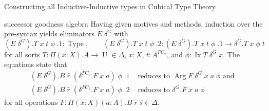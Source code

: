 \documentclass[runningheads]{llncs}
\DeclareMathOperator{\USet}{Type}
\DeclareMathOperator{\UU}{U}
\DeclareMathOperator{\Arg}{Arg}
\DeclareMathOperator{\Ix}{Ix}
\begin{document}
{\begin{section}{Constructing all Inductive-Inductive types in Cubical Type Theory}
\begin{subsection}{successor goodness algebra}
Having given motives and methods, induction over the pre-syntax yields eliminators $E\;\delta^G$ with \[(E\;\delta^G).T\;x\;t\;\phi\;.1 : \USet,\qquad (E\;\delta^G).T\;x\;t\;\phi\;.2 : (E\;\delta^G).T\;x\;t\;\phi\;.1 \to \delta^G.T\;x\;\phi\;t\] for all sorts $T : \Pi(x : X).A \to \UU \in \Delta$, $x : X$, $t : A^{PC_2}$, and $\phi : \Ix T\;\delta^G\;x$. The equations state that \begin{align*}(E\;\delta^G).B\;\hat{r}\;(\delta^{PC_2}.F\;x\;a)\;\phi\;.1&\text{ reduces to }\Arg F\;\delta^G\;x\;a\;\phi\text{ and }\\(E\;\delta^G).B\;\hat{r}\;(\delta^{PC_2}.F\;x\;a)\;\phi\;.2&\text{ reduces to }\delta^G.F\;x\;a\;\phi\end{align*} for all operations $F : \Pi(x : X)(a : A).B\;\hat{r}\;\hat{s}\in \Delta$.


\end{subsection}
\end{section}}
\end{document}
